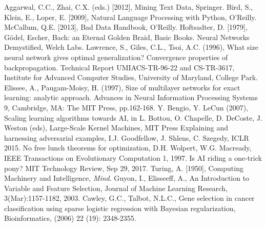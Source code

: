 \begin{thebibliography}{99}
 Aggarwal, C.C., Zhai, C.X. (eds.) [2012], Mining Text Data, Springer.
 Bird, S., Klein, E., Loper, E. [2009], Natural Language Processing with Python, O'Reilly.
 
 
  
 McCallum, Q.E. [2013], Bad Data Handbook, O'Reilly.
 Hoftsadter, D. [1979], G\"odel, Escher, Bach: an Eternal Golden Braid, Basic Books. 
  
 Neural Networks Demystified, Welch Labs.
 Lawrence, S., Giles, C.L., Tsoi, A.C. (1996), What size neural network gives optimal generalization? Convergence properties of backpropagation. Technical Report UMIACS-TR-96-22 and CS-TR-3617, Institute for Advanced Computer Studies, University of Maryland, College Park.
 Elissee, A., Paugam-Moisy, H. (1997), Size of multilayer networks for exact learning: analytic approach. Advances in Neural Information Processing Systems 9, Cambridge, MA: The MIT Press, pp.162-168.
 Y. Bengio, Y. LeCun (2007), Scaling learning algorithms towards AI, in L. Bottou, O. Chapelle, D. DeCoste, J. Weston (eds), Large-Scale Kernel Machines, MIT Press
 Explaining and harnessing adversarial examples, I.J. Goodfellow, J. Shlens, C. Szegedy, ICLR 2015.
 No free lunch theorems for optimization, D.H. Wolpert, W.G. Macready, IEEE Transactions on Evolutionary Computation 1, 1997.
 Is AI riding a one-trick pony? MIT Technology Review, Sep 29, 2017.
  
 Turing, A. [1950], Computing Machinery and Intelligence, \textit{Mind}.
 Guyon, I., Elisseeff, A., An Introduction to Variable and Feature Selection, Journal of Machine Learning Research, 3(Mar):1157-1182, 2003. 
 Cawley, G.C., Talbot, N.L.C., Gene selection in cancer classification using sparse logistic regression with Bayesian regularization, Bioinformatics, (2006) 22 (19): 2348-2355.

\end{thebibliography}
